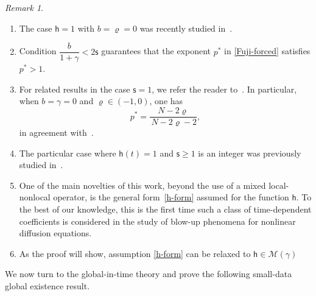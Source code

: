 \documentclass[12pt,reqno]{amsart}
\theoremstyle{plain}
\theoremstyle{definition}
\theoremstyle{remark}
\newtheorem{rem}[thm]{Remark}
\numberwithin{equation}{section}
\newcommand{\h}{\mathsf h}
\newcommand{\ts}{\mathsf{s}}
\begin{document}
\begin{rem}
~\rm
\begin{enumerate}[label=(\roman*)]
\item The case $\h = 1$ with $b = \varrho = 0$ was recently studied in~\cite{Beri-arXiv}.
\item Condition $\dfrac{b}{1+\gamma} < 2\ts$ guarantees that the exponent $p^*$ in \eqref{Fuji-forced} satisfies $p^* > 1$.
    \item For related results in the case $\ts = 1$, we refer the reader to~\cite{Opuscula, BLZ, JKS, MM}.  
In particular, when $b = \gamma = 0$ and $\varrho \in (-1,0)$, one has
$$
    p^* = \frac{N - 2\varrho}{\,N - 2\varrho - 2},
$$
in agreement with~\cite[Theorem~1.1, (1.8)]{JKS}.

    \item The particular case where $\h(t) = 1$ and $\ts \geq 1$ is an integer was previously studied in~\cite{Majd}.
    \item One of the main novelties of this work, beyond the use of a mixed local-nonlocal operator, is the general form~\eqref{h-form} assumed for the function $\h$. To the best of our knowledge, this is the first time such a class of time-dependent coefficients is considered in the study of blow-up phenomena for nonlinear diffusion equations.
    \item As the proof will show, assumption \eqref{h-form} can be relaxed to $\h \in\mathcal{M}(\gamma)$
\end{enumerate}
\end{rem}
We now turn to the global-in-time theory and prove the following small-data global existence result.
\end{document}
